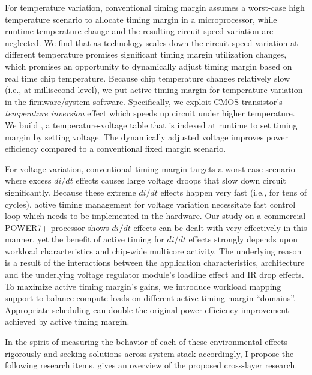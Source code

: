 For temperature variation, conventional timing margin assumes a worst-case high temperature scenario to allocate timing margin in a microprocessor, while runtime temperature change and the resulting circuit speed variation are neglected. We find that as technology scales down the circuit speed variation at different temperature promises significant timing margin utilization changes, which promises an opportunity to dynamically adjust timing margin based on real time chip temperature. Because chip temperature changes relatively slow (i.e., at millisecond level), we put active timing margin for temperature variation in the firmware/system software. Specifically, we exploit CMOS transistor's \textit{temperature inversion} effect which speeds up circuit under higher temperature. We build \tistates, a temperature-voltage table that is indexed at runtime to set timing margin by setting voltage. The dynamically adjusted voltage improves power efficiency compared to a conventional fixed margin scenario.

For voltage variation, conventional timing margin targets a worst-case scenario where excess $di/dt$ effects causes large voltage droops that slow down circuit significantly. Because these extreme $di/dt$ effects happen very fast (i.e., for tens of cycles), active timing management for voltage variation necessitate fast control loop which needs to be implemented in the hardware. Our study on a commercial POWER7+ processor shows $di/dt$ effects can be dealt with very effectively in this manner, yet the benefit of active timing for $di/dt$ effects strongly depends upon workload characteristics and chip-wide multicore activity. The underlying reason is a result of the interactions between the application characteristics, architecture and the underlying voltage regulator module's loadline effect and IR drop effects. To maximize active timing margin's gains, we introduce workload mapping support to balance compute loads on different active timing margin ``domains''. Appropriate scheduling can double the original power efficiency improvement achieved by active timing margin.

In the spirit of measuring the behavior of each of these environmental effects rigorously and seeking solutions across system stack accordingly, I propose the following research items.  gives an overview of the proposed cross-layer research.


